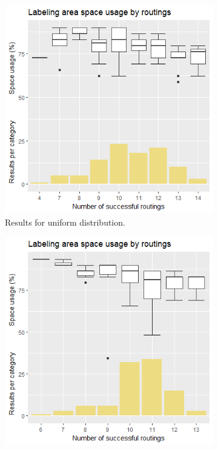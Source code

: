 \documentclass[11pt,a4paper]{vutinfth}
\begin{document}
\begin{figure}
	\centering
	\begin{subfigure}[b]{\textwidth}
		\centering
		\includegraphics[scale=0.6]{Rplot_15u_longer.png}
		\caption{\label{fig:15uLong}Results for uniform distribution.}
	\end{subfigure}
	\begin{subfigure}[b]{\textwidth}
		\centering
		\includegraphics[scale=0.6]{Rplot_15bl_longer.png}

\end{subfigure}
\end{figure}
\end{document}
